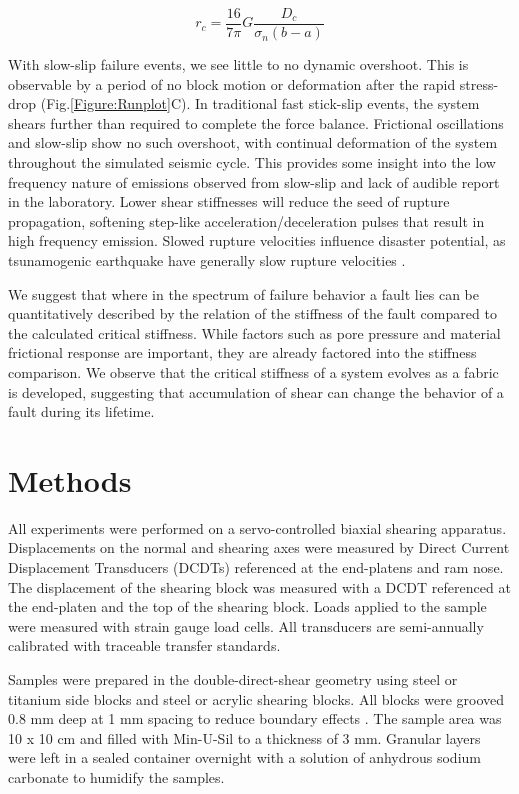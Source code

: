 \documentclass[11pt]{article}
\begin{document}
\begin{equation}
    r_c = \frac{16}{7\pi}G \frac{D_c}{\sigma_n (b-a)}
    \label{equation:rc}
\end{equation}

With slow-slip failure events, we see little to no dynamic overshoot. This is observable by a period of no block motion or
deformation after the rapid stress-drop (Fig.\ref{Figure:Runplot}C).  In
traditional fast stick-slip events, the system shears further than required to
complete the force balance. Frictional oscillations and slow-slip
show no such overshoot, with continual deformation of the system throughout the
simulated seismic cycle. This provides some insight into the low frequency
nature of emissions observed from slow-slip and lack of audible report in the
laboratory. Lower shear stiffnesses will reduce the seed of rupture propagation,
softening step-like acceleration/deceleration pulses that result in high
frequency emission. Slowed rupture velocities influence disaster potential, as
tsunamogenic earthquake have generally slow rupture velocities
\cite{Kanamori:1993, Bilek:1999}.

We suggest that where in the spectrum of failure behavior a fault lies can be
quantitatively described by the relation of the stiffness of the fault compared
to the calculated critical stiffness. While factors such as pore pressure and
material frictional response are important, they are already factored into  the
stiffness comparison. We observe that the critical stiffness of a system evolves
as a fabric is developed, suggesting that accumulation of shear can change the
behavior of a fault during its lifetime.

\section{Methods}
All experiments were performed on a servo-controlled biaxial shearing apparatus.
Displacements on the normal and shearing axes were measured by Direct Current
Displacement Transducers (DCDTs) referenced at the end-platens and ram nose. The
displacement of the shearing block was measured with a DCDT referenced at the
end-platen and the top of the shearing block. Loads applied to the sample were
measured with strain gauge load cells. All transducers are semi-annually
calibrated with traceable transfer standards.

Samples were prepared in the double-direct-shear geometry using steel or
titanium side blocks and steel or acrylic shearing blocks. All blocks were
grooved 0.8 mm deep at 1 mm spacing to reduce boundary effects \cite{Anthony:2005}. The sample area
was 10 x 10 cm and filled with Min-U-Sil to a thickness of 3 mm. Granular layers
were left in a sealed container overnight with a solution of anhydrous sodium
carbonate to humidify the samples.
\end{document}
